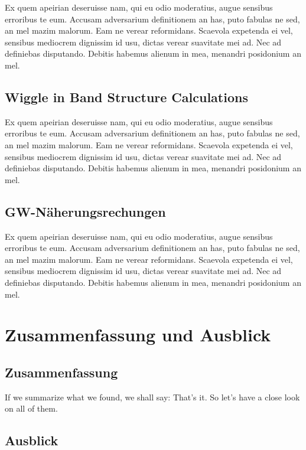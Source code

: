 \documentclass[11pt,twoside,german]{book}
\begin{document}
Ex quem apeirian deseruisse nam, qui eu odio moderatius, augue sensibus erroribus te eum. Accusam adversarium definitionem an has, puto fabulas ne sed, an mel mazim malorum. Eam ne verear reformidans. Scaevola expetenda ei vel, sensibus mediocrem dignissim id usu, dictas verear suavitate mei ad. Nec ad definiebas disputando. Debitis habemus alienum in mea, menandri posidonium an mel.


\section{Wiggle in Band Structure Calculations}

Ex quem apeirian deseruisse nam, qui eu odio moderatius, augue sensibus erroribus te eum. Accusam adversarium definitionem an has, puto fabulas ne sed, an mel mazim malorum. Eam ne verear reformidans. Scaevola expetenda ei vel, sensibus mediocrem dignissim id usu, dictas verear suavitate mei ad. Nec ad definiebas disputando. Debitis habemus alienum in mea, menandri posidonium an mel.


\section{GW-Näherungsrechungen}

Ex quem apeirian deseruisse nam, qui eu odio moderatius, augue sensibus erroribus te eum. Accusam adversarium definitionem an has, puto fabulas ne sed, an mel mazim malorum. Eam ne verear reformidans. Scaevola expetenda ei vel, sensibus mediocrem dignissim id usu, dictas verear suavitate mei ad. Nec ad definiebas disputando. Debitis habemus alienum in mea, menandri posidonium an mel.


\chapter{Zusammenfassung und Ausblick}
\section{Zusammenfassung}

If we summarize what we found, we shall say: That's it. So let's have a close look on all of them.

\section{Ausblick}
\end{document}
